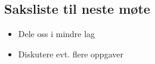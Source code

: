 \documentclass[11pt]{meetingmins}
\begin{document}
\subsection{Saksliste til neste m{\o}te}

\begin{itemize}
\item Dele oss i mindre lag
\item Diskutere evt. flere oppgaver
\end{itemize}

\end{document}
